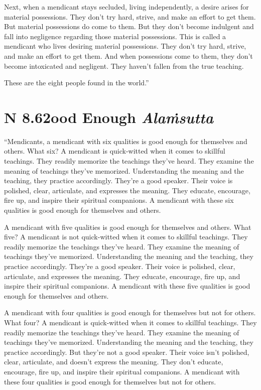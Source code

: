 \documentclass[12pt,openany]{book}%
\newcommand*{\suttatitleacronym}[1]{\smaller[2]{#1}\vspace*{.3em}}
\newcommand*{\suttatitletranslation}[1]{\linebreak{#1}}
\newcommand*{\suttatitleroot}[1]{\linebreak\smaller[2]\itshape{#1}}
\newcommand*{\tocacronym}[1]{\hspace*{-3.3em}{#1}\quad}
\newcommand*{\toctranslation}[1]{#1}
\newcommand*{\tocroot}[1]{(\textit{#1})}
\begin{document}
Next, when a mendicant stays secluded, living independently, a desire arises for material possessions. They don’t try hard, strive, and make an effort to get them. But material possessions do come to them. But they don’t become indulgent and fall into negligence regarding those material possessions. This is called a mendicant who lives desiring material possessions. They don’t try hard, strive, and make an effort to get them. And when possessions come to them, they don’t become intoxicated and negligent. They haven’t fallen from the true teaching. 

These are the eight people found in the world.” 

%
\section*{{\suttatitleacronym AN 8.62}{\suttatitletranslation Good Enough }{\suttatitleroot Alaṁsutta}}
\addcontentsline{toc}{section}{\tocacronym{AN 8.62} \toctranslation{Good Enough } \tocroot{Alaṁsutta}}

“Mendicants, a mendicant with six qualities is good enough for themselves and others. What six? A mendicant is quick-witted when it comes to skillful teachings. They readily memorize the teachings they’ve heard. They examine the meaning of teachings they’ve memorized. Understanding the meaning and the teaching, they practice accordingly. They’re a good speaker. Their voice is polished, clear, articulate, and expresses the meaning. They educate, encourage, fire up, and inspire their spiritual companions. A mendicant with these six qualities is good enough for themselves and others. 

A mendicant with five qualities is good enough for themselves and others. What five? A mendicant is not quick-witted when it comes to skillful teachings. They readily memorize the teachings they’ve heard. They examine the meaning of teachings they’ve memorized. Understanding the meaning and the teaching, they practice accordingly. They’re a good speaker. Their voice is polished, clear, articulate, and expresses the meaning. They educate, encourage, fire up, and inspire their spiritual companions. A mendicant with these five qualities is good enough for themselves and others. 

A mendicant with four qualities is good enough for themselves but not for others. What four? A mendicant is quick-witted when it comes to skillful teachings. They readily memorize the teachings they’ve heard. They examine the meaning of teachings they’ve memorized. Understanding the meaning and the teaching, they practice accordingly. But they’re not a good speaker. Their voice isn’t polished, clear, articulate, and doesn’t express the meaning. They don’t educate, encourage, fire up, and inspire their spiritual companions. A mendicant with these four qualities is good enough for themselves but not for others. 
\end{document}
